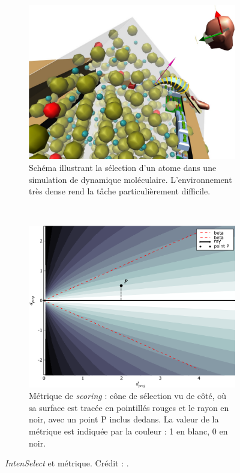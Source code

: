 	\begin{figure}[!htbp]
		\begin{subfigure}[t]{0.49\textwidth}
			\centering
			\includegraphics[width=\textwidth]{figures/ch2/intensMD}
			\caption{Schéma illustrant la sélection d'un atome dans une simulation de dynamique moléculaire. L'environnement très dense rend la tâche particulièrement difficile.}
			\label{fig:intensMD}
		\end{subfigure}
		~
		\begin{subfigure}[t]{0.49\textwidth}
			\centering
			\includegraphics[width=\textwidth]{figures/ch2/intensMetric}
			\caption{Métrique de \emph{scoring} : cône de sélection vu de côté, où sa surface est tracée en pointillés rouges et le rayon en noir, avec un point P inclus dedans. La valeur de la métrique est indiquée par la couleur : 1 en blanc, 0 en noir.}
			\label{fig:intensMetric}
		\end{subfigure}
		\caption[\emph{IntenSelect} et métrique]{\emph{IntenSelect} et métrique. Crédit : \cite{de2005intenselect}.}
		\label{fig:plop}
	\end{figure}
	
